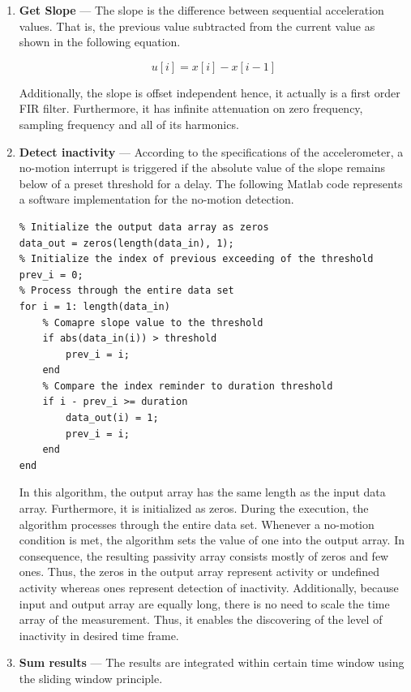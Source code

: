 \documentclass[english,12pt,a4paper,pdftex,elec,utf8]{aaltothesis}
\begin{document}
\begin{enumerate}
\item \textbf{Get Slope} --- The slope is the difference between sequential acceleration values. That is, the previous value subtracted from the current value as shown in the following equation. 

\begin{equation}
u[i] = x[i] - x[i-1]
\end{equation}

Additionally, the slope is offset independent hence, it actually is a first order FIR filter. Furthermore, it has infinite attenuation on zero frequency, sampling frequency and all of its harmonics. 

\item \textbf{Detect inactivity} --- According to the specifications of the accelerometer, a no-motion interrupt is triggered if the absolute value of the slope remains below of a preset threshold for a delay. The following Matlab code represents a software implementation for the no-motion detection. 

\begin{lstlisting}
% Initialize the output data array as zeros
data_out = zeros(length(data_in), 1);
% Initialize the index of previous exceeding of the threshold
prev_i = 0; 
% Process through the entire data set
for i = 1: length(data_in)
	% Comapre slope value to the threshold
    if abs(data_in(i)) > threshold
        prev_i = i;
    end
    % Compare the index reminder to duration threshold
    if i - prev_i >= duration
        data_out(i) = 1;
        prev_i = i;
    end
end	
\end{lstlisting}

In this algorithm, the output array has the same length as the input data array. Furthermore, it is initialized as zeros. During the execution, the algorithm processes through the entire data set. Whenever a no-motion condition is met, the algorithm sets the value of one into the output array. In consequence, the resulting passivity array consists mostly of zeros and few ones. Thus, the zeros in the output array represent activity or undefined activity whereas ones represent detection of inactivity. Additionally, because input and output array are equally long, there is no need to scale the time array of the measurement. Thus, it enables the discovering of the level of inactivity in desired time frame.


\item \textbf{Sum results} --- The results are integrated within certain time window using the sliding window principle.


\end{enumerate}
\end{document}
